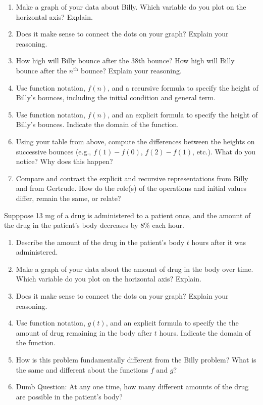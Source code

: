 \documentclass{ximera}
\begin{document}
\begin{problem}
\begin{enumerate}
\item Make a graph of your data about Billy.  Which variable do you plot on the horizontal axis?  Explain.  

\item Does it make sense to connect the dots on your graph?  Explain your reasoning.  

\item How high will Billy bounce after the 38th bounce?  How high will Billy bounce after the $n^\mathrm{th}$ bounce?  Explain your reasoning. 

\item  Use function notation, $f(n)$, and a recursive formula to specify the height of Billy's bounces, including the initial condition and general term.   

\item Use function notation, $f(n)$, and an explicit formula to specify the height of Billy's bounces.  Indicate the domain of the function.    

\item Using your table from above, compute the differences between the heights on successive bounces (e.g.,  $f(1) - f(0)$, $f(2) - f(1)$, etc.).  What do you notice?  Why does this happen?

\item Compare and contrast the explicit and recursive representations from Billy and from Gertrude.  How do the role(s) of the operations and initial values differ, remain the same, or relate?
\end{enumerate}
\end{problem}

\begin{problem}
Supppose 13 mg of a drug is administered to a patient once, and the amount of the drug in the patient's body decreases by 8\% each hour.  
\begin{enumerate}
\item Describe the amount of the drug in the patient's body $t$ hours after it was administered.  

\item Make a graph of your data about the amount of drug in the body over time.  Which variable do you plot on the horizontal axis?  Explain.  

\item Does it make sense to connect the dots on your graph?  Explain your reasoning.  

\item Use function notation, $g(t)$, and an explicit formula to specify the the amount of drug remaining in the body after $t$ hours.  Indicate the domain of the function. 

\item How is this problem fundamentally different from the Billy problem?  What is the same and different about the functions $f$ and $g$?  

\item Dumb Question:  At any one time, how many different amounts of the drug are possible in the patient's body?
\end{enumerate}
\end{problem}
\end{document}
